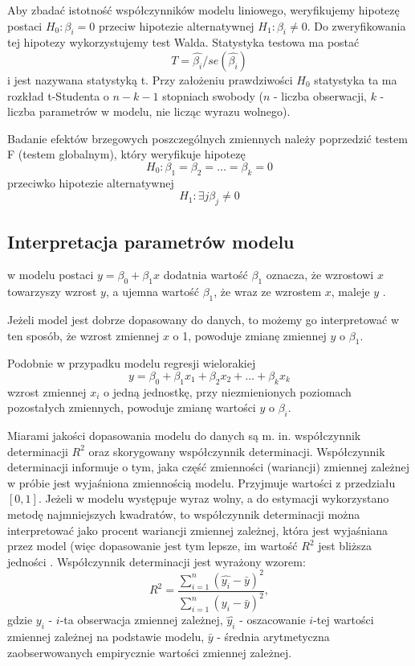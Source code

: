 \documentclass[12pt]{mwbk}
\theoremstyle{plain}
\theoremstyle{definition}
\theoremstyle{remark}
\begin{document}
Aby zbadać istotność współczynników modelu liniowego, weryfikujemy hipotezę postaci $H_0: \beta_i = 0$ przeciw hipotezie alternatywnej $H_1: \beta_i \neq 0.																																																																																																																																																																																																																																																																																																																																																																																																																																																																																																																													$ Do zweryfikowania tej hipotezy wykorzystujemy test Walda. Statystyka testowa ma postać $$T=\hat{\beta_i}/se(\hat{\beta_i})$$ i jest nazywana statystyką t. Przy założeniu prawdziwości $H_0$ statystyka ta ma rozkład t-Studenta o $n-k-1$ stopniach swobody ($n$ - liczba obserwacji, $k$ - liczba parametrów w modelu, nie licząc wyrazu wolnego).

Badanie efektów brzegowych poszczególnych zmiennych należy poprzedzić testem F (testem globalnym), który weryfikuje hipotezę $$H_0: \beta_1=\beta_2=\ldots=\beta_k=0$$
 przeciwko hipotezie alternatywnej $$H_1: \exists{j} \beta_j \neq 0 $$

\subsection{Interpretacja parametrów modelu}

w modelu postaci $y=\beta_0 +\beta_1 x$ dodatnia wartość $\beta_1$ oznacza, że wzrostowi $x$ towarzyszy wzrost $y$, a ujemna wartość $\beta_1$, że wraz ze wzrostem $x$, maleje $y$ \cite{rozrzut}. 

Jeżeli model jest dobrze dopasowany do danych, to możemy go interpretować w ten sposób, że wzrost zmiennej $x$ o 1, powoduje zmianę zmiennej $y$ o $\beta_1$. 

Podobnie w przypadku modelu regresji wielorakiej
$$y=\beta_0+\beta_1 x_1+\beta_2 x_2 + \ldots + \beta_k x_k$$
wzrost zmiennej $x_i$ o jedną jednostkę, przy niezmienionych poziomach pozostałych zmiennych, powoduje zmianę wartości $y$ o $\beta_i$.

Miarami jakości dopasowania modelu do danych są m. in. współczynnik determinacji $R^2$ oraz skorygowany współczynnik determinacji. Współczynnik determinacji informuje o tym, jaka część zmienności (wariancji) zmiennej zależnej w próbie jest wyjaśniona zmiennością modelu. Przyjmuje wartości z przedziału $[0,1]$. Jeżeli w modelu występuje wyraz wolny, a do estymacji wykorzystano metodę najmniejszych kwadratów, to współczynnik determinacji można interpretować jako procent wariancji zmiennej zależnej, która jest wyjaśniana przez model (więc dopasowanie jest tym lepsze, im wartość $R^2$ jest bliższa jedności \cite{r2}. Współczynnik determinacji jest wyrażony wzorem:
$$R^2=\frac{\sum\limits_{i=1}^{n}(\hat{y_i}-\bar{y})^2}{\sum\limits_{i=1}^{n}(y_i-\bar{y})^2},$$ gdzie $y_i$ - $i$-ta obserwacja zmiennej zależnej, $\hat{y_i}$ - oszacowanie $i$-tej wartości zmiennej zależnej na podstawie modelu, $\bar{y}$ - średnia arytmetyczna zaobserwowanych empirycznie wartości zmiennej zależnej.
\end{document}
